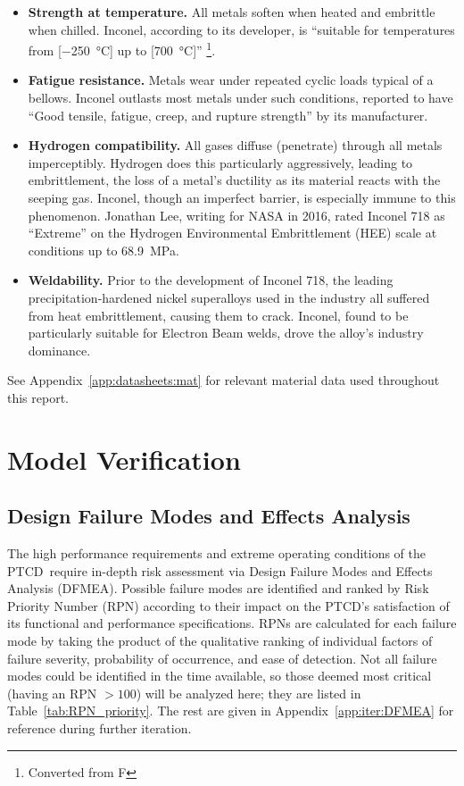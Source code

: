 \documentclass[12pt, letterpaper]{report}%
\newcommand{\device}{PTCD}
\begin{document}
				\begin{itemize}
					\item \textbf{Strength at temperature.} All metals soften when heated and embrittle when chilled. Inconel, according to its developer, is ``suitable for temperatures from [\SI{-250}{\celsius}] up to [\SI{700}{\celsius}]''%
						\footnote{Converted from \textdegree F}\cite[p.~62, 74--76]{ref_Inconel_1965}.
					\item \textbf{Fatigue resistance.} Metals wear under repeated cyclic loads typical of a bellows. Inconel outlasts most metals under such conditions, reported to have ``Good tensile, fatigue, creep, and rupture strength'' by its manufacturer\cite[p.~1]{ref_SpecialMetals_Inc}.
					\item \textbf{Hydrogen compatibility.} All gases diffuse (penetrate) through all metals imperceptibly. Hydrogen does this particularly aggressively, leading to embrittlement, the loss of a metal's ductility as its material reacts with the seeping gas.
						Inconel, though an imperfect barrier, is especially immune to this phenomenon. Jonathan Lee, writing for NASA in 2016\cite[Table~4]{ref_NASA_Inc}, rated Inconel 718 as ``Extreme'' on the Hydrogen Environmental Embrittlement (HEE) scale at conditions up to \SI{68.9}{\mega\pascal}.
					\item \textbf{Weldability.} Prior to the development of Inconel 718, the leading precipitation-hardened nickel superalloys used in the industry all suffered from heat embrittlement, causing them to crack. Inconel, found to be particularly suitable for Electron Beam welds, drove the alloy's industry dominance.
				\end{itemize}

				See Appendix~\ref{app:datasheets:mat} for relevant material data used throughout this report.

\chapter{Model Verification}
\label{chap:DFMEA}

	\section{Design Failure Modes and Effects Analysis}
	\label{sec:DFMEA:intro}

		The high performance requirements and extreme operating conditions of the \device\ require in-depth risk assessment via Design Failure Modes and Effects Analysis (DFMEA). Possible failure modes are identified
		and ranked by Risk Priority Number (RPN) according to their impact on the \device's satisfaction of its functional and performance specifications. RPNs are calculated for each failure mode
		by taking the product of the qualitative ranking of individual factors of failure severity, probability of occurrence, and ease of detection.
		Not all failure modes could be identified in the time available, so those deemed most critical (having an RPN $> 100$) will be analyzed here;
		they are listed in Table~\ref{tab:RPN_priority}.
		The rest are given in Appendix~\ref{app:iter:DFMEA} for reference during further iteration.
		
\end{document}
